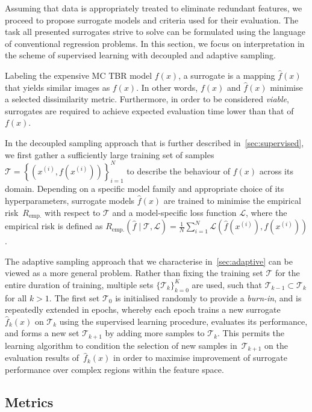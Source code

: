Assuming that data is appropriately treated to eliminate redundant
features, we proceed to propose surrogate models and criteria
used for their evaluation. The task all presented surrogates strive to solve can be
formulated using the language of conventional regression problems. In this section,
we focus on interpretation in the scheme of supervised learning with decoupled
and adaptive sampling.

Labeling the expensive MC TBR model $f(x)$, a surrogate is a mapping
$\hat{f}(x)$ that yields similar images as $f(x)$. In other words, $f(x)$ and
$\hat{f}(x)$ minimise a selected dissimilarity metric. Furthermore, in order to
be considered \textit{viable}, surrogates are required to achieve expected evaluation time
lower than that of $f(x)$.

In the decoupled sampling approach that is further described
in~\cref{sec:supervised}, we first gather a sufficiently large
training set of samples $\mathcal{T}=\left\{\left( x^{(i)},f\left(x^{(i)}\right) \right)\right\}_{i=1}^N$
to describe the behaviour of $f(x)$ across its domain.
Depending on a specific model family and appropriate choice of its
hyperparameters, surrogate models $\hat{f}(x)$ are trained to minimise
the empirical risk~$R_{\text{emp.}}$ with respect to $\mathcal{T}$ and a model-specific
loss function $\mathcal{L}$, where the empirical risk is defined as
$R_{\text{emp.}}(\hat{f}\mid\mathcal{T},\mathcal{L})
	=\frac{1}{N}\sum_{i=1}^N
	\mathcal{L}\left(\hat{f}(x^{(i)}),f(x^{(i)})\right)$.


The adaptive sampling approach that we characterise in~\cref{sec:adaptive} can be viewed as a more general problem.
Rather than fixing the training set $\mathcal{T}$ for the entire duration of
training, multiple sets $\{\mathcal{T}_k\}_{k=0}^K$ are used, such that
$\mathcal{T}_{k-1}\subset\mathcal{T}_k$ for all $k>1$. The first set
$\mathcal{T}_0$ is initialised randomly to provide a \textit{burn-in}, and is
repeatedly extended in epochs, whereby each epoch trains a new surrogate~$\hat{f}_k(x)$ on
$\mathcal{T}_k$ using the supervised learning procedure, evaluates its
performance, and forms a new set $\mathcal{T}_{k+1}$ by adding more samples to
$\mathcal{T}_k$. This permits the learning algorithm to condition the selection
of new samples in~$\mathcal{T}_{k+1}$ on the evaluation results
of~$\hat{f}_k(x)$ in order to maximise improvement of
surrogate performance over complex regions within the feature space.


\subsection{Metrics}
\label{sec:metrics}

